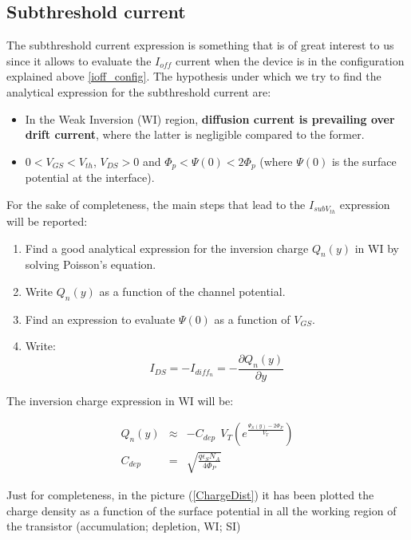 \documentclass[a4paper, 12pt, twoside, openright]{report}
\begin{document}
\subsection{Subthreshold current} %

The subthreshold current expression is something that is of great interest to us since it allows to evaluate the $I_{off}$ current when the device is in the configuration explained above \ref{ioff_config}. The hypothesis under which we try to find the analytical expression for the subthreshold current are:

\begin{itemize}
\item In the Weak Inversion (WI) region, \textbf{diffusion current is prevailing over drift current}, where the latter is negligible compared to the former.
\item $0<V_{GS}<V_{th}$, $V_{DS}>0$ and $\Phi_{p}<\Psi(0)<2\Phi_{p}$ (where $\Psi(0)$ is the surface potential at the interface). 
\end{itemize}

For the sake of completeness, the main steps that lead to the $I_{subV_{th}}$ expression will be reported:

\begin{enumerate}
\item Find a good analytical expression for the inversion charge $Q_{n}(y)$ in WI by solving Poisson's equation.
\item Write $Q_{n}(y)$ as a function of the channel potential.
\item Find an expression to evaluate $\Psi(0)$ as a function of $V_{GS}$.
\item Write:
\begin{equation}\label{punto4}
I_{DS}=-I_{diff_{n}}=-\frac{\partial Q_{n}(y)}{\partial y}
\end{equation}
\end{enumerate}

The inversion charge expression in WI will be:

	\begin{eqnarray*}
	      Q_n(y)&\approx &-C_{dep}~~V_T
	             \left(e^{\displaystyle \frac{\Psi_S(y)-2\Phi_P}{V_T}}
	              \right)\\[2ex]
	       C_{dep}&=& {\sqrt{\frac{q \epsilon_S N_A}{ 4\Phi_P}}}
	\end{eqnarray*}

Just for completeness, in the picture (\ref{ChargeDist}) it has been plotted the charge density as a function of the surface potential in all the working region of the transistor (accumulation; depletion, WI; SI)
\end{document}
